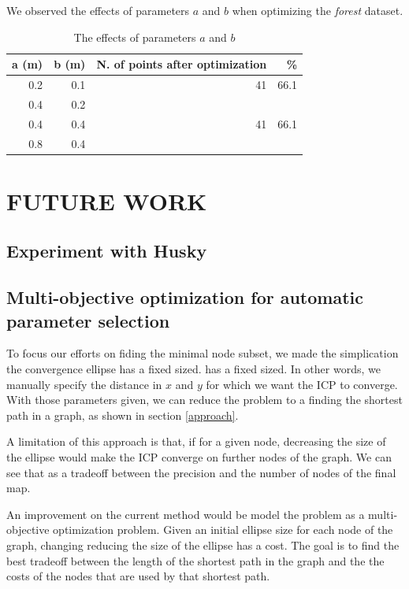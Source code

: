 \documentclass[letterpaper,10 pt,conference]{ieeeconf}
\begin{document}
We observed the effects of parameters $a$ and $b$ when optimizing the \textit{forest} dataset.

\begin{table}[h]
\centering
\begin{tabular}{|r|r|r|r|}
  \hline
a (m) & b (m) &  N. of points after optimization & \% \\
\hline
  0.2 & 0.1 & 41 & 66.1  \\
\hline
 0.4 & 0.2 &  &  \\
  \hline
 0.4 & 0.4 & 41 & 66.1 \\
  \hline
 0.8 & 0.4 & &  \\
  \hline
\end{tabular}
\caption{The effects of parameters $a$ and $b$}
\label{tabopti}
\end{table}

\section{FUTURE WORK}

\subsection{Experiment with Husky}

\subsection{Multi-objective optimization for automatic parameter selection}

To focus our efforts on fiding the minimal node subset, we made the simplication the convergence ellipse has a fixed sized.
has a fixed sized.  In other words, we manually specify the distance in $x$ and $y$ for which we
want the ICP to converge. With those parameters given, we can reduce the problem to a finding the
shortest path in a graph, as shown in section \ref{approach}.


A limitation of this approach is that, if for a given node, decreasing the size of the ellipse would
make the ICP converge on further nodes of the graph. We can see that as a tradeoff between the
precision and the number of nodes of the final map.


An improvement on the current method would be model the problem as a multi-objective optimization
problem. Given an initial ellipse size for each node of the graph, changing reducing the size of the
ellipse has a cost. The goal is to find the best tradeoff between the length of the shortest path in
the graph and the the costs of the nodes that are used by that shortest path.
\end{document}
